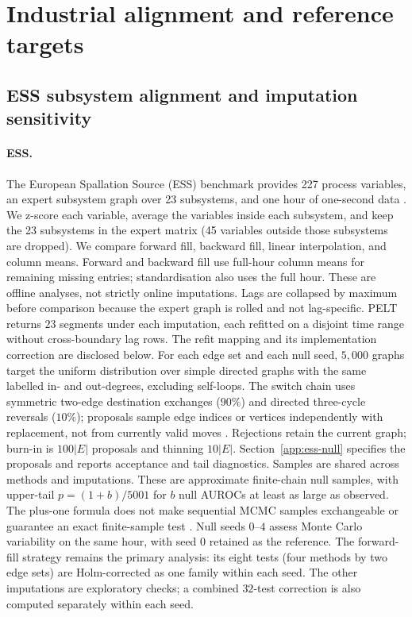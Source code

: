 \documentclass[11pt]{article}
\begin{document}
\FloatBarrier
\section{Industrial alignment and reference targets}
\label{supp:industrial}

\subsection{ESS subsystem alignment and imputation sensitivity}
\label{sec:real}

\paragraph{ESS.}
The European Spallation Source (ESS) benchmark provides 227 process variables, an expert subsystem graph over
23 subsystems, and one hour of one-second data \citep{mogensen2024causal}. We
z-score each variable, average the variables inside each subsystem, and keep the
23 subsystems in the expert matrix (45 variables outside those subsystems are
dropped). We compare forward fill, backward fill, linear interpolation, and
column means. Forward and backward fill use full-hour column means for remaining
missing entries; standardisation also uses the full hour. These are offline
analyses, not strictly online imputations. Lags are collapsed by maximum before comparison
because the expert graph is rolled and not lag-specific. PELT returns $23$
segments under each imputation, each refitted on a disjoint time range without
cross-boundary lag rows. The refit mapping and its implementation correction are disclosed below. For each edge set and each null seed, $5{,}000$ graphs target the uniform
distribution over simple directed graphs with the same labelled in- and out-degrees,
excluding self-loops. The switch chain uses symmetric two-edge destination
exchanges ($90\%$) and directed three-cycle reversals ($10\%$); proposals sample
edge indices or vertices independently with replacement, not from currently
valid moves \citep{lamar2009uniform}. Rejections retain the current graph;
burn-in is $100|E|$ proposals and thinning $10|E|$. Section~\ref{app:ess-null}
specifies the proposals and reports acceptance and tail diagnostics.
Samples are shared across methods and imputations.
These are approximate finite-chain null samples, with upper-tail $p=(1+b)/5001$
for $b$ null AUROCs at least as large as observed. The plus-one formula does not
make sequential MCMC samples exchangeable or guarantee an exact finite-sample
test \citep{howes2024mcmc}. Null seeds $0$--$4$ assess
Monte Carlo variability on the same hour, with seed $0$ retained as the reference.
The forward-fill strategy remains
the primary analysis: its eight tests (four methods by two edge sets) are
Holm-corrected as one family within each seed. The other imputations are exploratory
checks; a combined $32$-test correction is also computed separately within each seed.
\end{document}
